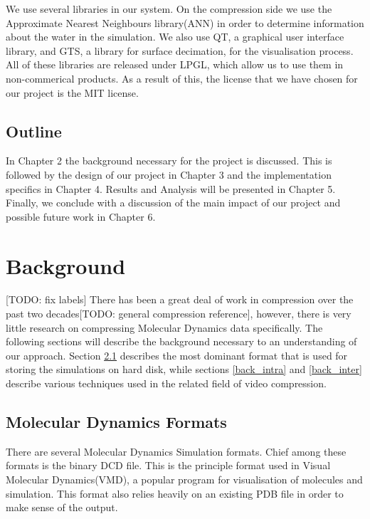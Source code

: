 \documentclass[a4paper,11pt]{report}
\begin{document}
We use several libraries in our system. On the compression side we use the Approximate Nearest Neighbours library(ANN) in order to determine information about the water in the simulation. We also use QT, a graphical user interface library, and GTS, a library for surface decimation, for the visualisation process. All of these libraries are released under LPGL, which allow us to use them in non-commerical products. As a result of this, the license that we have chosen for our project is the MIT license.

\section{Outline}

In Chapter 2 the background necessary for the project is discussed. This is followed by the design of our project in Chapter 3 and the implementation specifics in Chapter 4. Results and Analysis will be presented in Chapter 5. Finally, we conclude with a discussion of the main impact of our project and possible future work in Chapter 6.


\chapter{Background}

[TODO: fix labels]
There has been a great deal of work in compression over the past two decades[TODO: general compression reference], however, there is very little research on compressing Molecular Dynamics data specifically.
The following sections will describe the background necessary to an understanding of our approach.
Section \ref{back_mdf} describes the most dominant format that is used for storing the simulations on hard disk,
while sections \ref{back_intra} and \ref{back_inter} describe various techniques used in the related field of video compression.

\section{Molecular Dynamics Formats}
\label{back_mdf}

There are several Molecular Dynamics Simulation formats. Chief among these formats is the binary DCD file. This is the principle format used in Visual Molecular Dynamics(VMD)\cite{vmd}, a popular program for visualisation of molecules and simulation. This format also relies heavily on an existing PDB file in order to make sense of the output.
\end{document}
